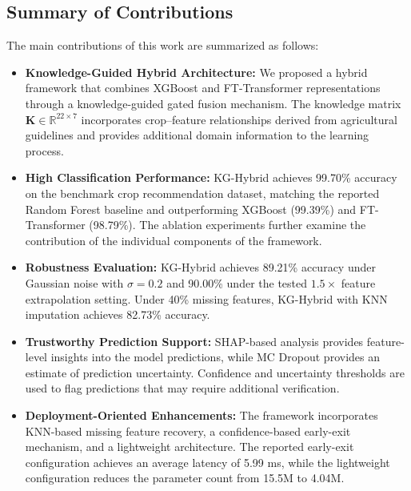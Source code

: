 \documentclass[journal]{IEEEtran}
\begin{document}
\subsection{Summary of Contributions}

The main contributions of this work are summarized as follows:

\begin{itemize}[leftmargin=1.2em]

    \item \textbf{Knowledge-Guided Hybrid Architecture:}
    We proposed a hybrid framework that combines XGBoost and FT-Transformer representations through a knowledge-guided gated fusion mechanism. The knowledge matrix $\mathbf{K} \in \mathbb{R}^{22 \times 7}$ incorporates crop--feature relationships derived from agricultural guidelines and provides additional domain information to the learning process.

    \item \textbf{High Classification Performance:}
    KG-Hybrid achieves 99.70\% accuracy on the benchmark crop recommendation dataset, matching the reported Random Forest baseline and outperforming XGBoost (99.39\%) and FT-Transformer (98.79\%). The ablation experiments further examine the contribution of the individual components of the framework.

    \item \textbf{Robustness Evaluation:}
    KG-Hybrid achieves 89.21\% accuracy under Gaussian noise with $\sigma=0.2$ and 90.00\% under the tested $1.5\times$ feature extrapolation setting. Under 40\% missing features, KG-Hybrid with KNN imputation achieves 82.73\% accuracy.

    \item \textbf{Trustworthy Prediction Support:}
    SHAP-based analysis provides feature-level insights into the model predictions, while MC Dropout provides an estimate of prediction uncertainty. Confidence and uncertainty thresholds are used to flag predictions that may require additional verification.

    \item \textbf{Deployment-Oriented Enhancements:}
    The framework incorporates KNN-based missing feature recovery, a confidence-based early-exit mechanism, and a lightweight architecture. The reported early-exit configuration achieves an average latency of 5.99 ms, while the lightweight configuration reduces the parameter count from 15.5M to 4.04M.
    
\end{itemize}
\end{document}
